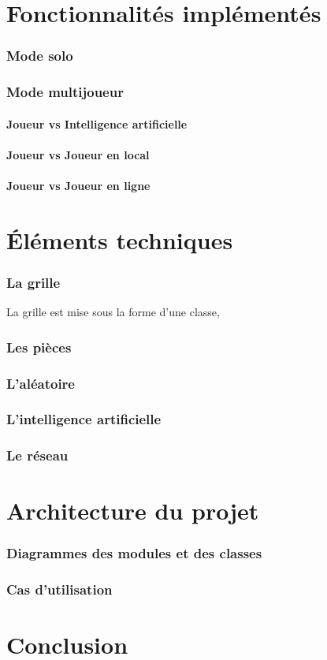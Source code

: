\documentclass[]{report}
\begin{document}
\part{Fonctionnalités implémentés}
\section{Mode solo}
\section{Mode multijoueur}
\subsection{Joueur vs Intelligence artificielle}
\subsection{Joueur vs Joueur en local}
\subsection{Joueur vs Joueur en ligne}

\part{Éléments techniques}
\section{La grille}
La grille est mise sous la forme d'une classe, 
\section{Les pièces}
\section{L'aléatoire}
\section{L'intelligence artificielle}
\section{Le réseau}

\part{Architecture du projet}
\section{Diagrammes des modules et des classes}
\section{Cas d'utilisation}

\part{Conclusion}
\end{document}
